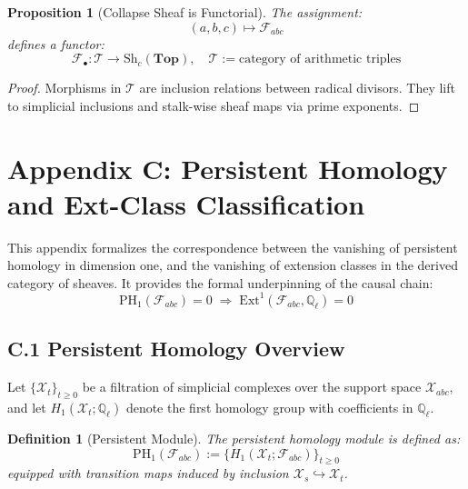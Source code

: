 \documentclass[11pt]{article}
\newtheorem{definition}[theorem]{Definition}
\newtheorem{proposition}[theorem]{Proposition}
\begin{document}
\begin{proposition}[Collapse Sheaf is Functorial]
The assignment:
\[
(a,b,c) \mapsto \mathcal{F}_{abc}
\]
defines a functor:
\[
\mathcal{F}_\bullet : \mathcal{T} \to \mathrm{Sh}_c(\mathbf{Top}), \quad \mathcal{T} := \text{category of arithmetic triples}
\]
\end{proposition}

\begin{proof}
Morphisms in \( \mathcal{T} \) are inclusion relations between radical divisors.  
They lift to simplicial inclusions and stalk-wise sheaf maps via prime exponents.
\end{proof}



\section*{Appendix C: Persistent Homology and Ext-Class Classification}

This appendix formalizes the correspondence between the vanishing of persistent homology in dimension one,  
and the vanishing of extension classes in the derived category of sheaves.  
It provides the formal underpinning of the causal chain:
\[
\mathrm{PH}_1(\mathcal{F}_{abc}) = 0 \;\Rightarrow\; \mathrm{Ext}^1(\mathcal{F}_{abc}, \mathbb{Q}_\ell) = 0
\]

\subsection*{C.1 Persistent Homology Overview}

Let \( \{ \mathcal{X}_t \}_{t \geq 0} \) be a filtration of simplicial complexes over the support space \( \mathcal{X}_{abc} \),  
and let \( H_1(\mathcal{X}_t; \mathbb{Q}_\ell) \) denote the first homology group with coefficients in \( \mathbb{Q}_\ell \).

\begin{definition}[Persistent Module]
The persistent homology module is defined as:
\[
\mathrm{PH}_1(\mathcal{F}_{abc}) := \{ H_1(\mathcal{X}_t; \mathcal{F}_{abc}) \}_{t \geq 0}
\]
equipped with transition maps induced by inclusion \( \mathcal{X}_s \hookrightarrow \mathcal{X}_t \).
\end{definition}
\end{document}
